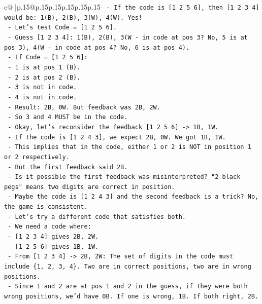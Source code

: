 \documentclass{article}
\begin{document}
{\begin{supertabular}{c@{$\;$}|p{.15\linewidth}@{}p{.15\linewidth}p{.15\linewidth}p{.15\linewidth}p{.15\linewidth}p{.15\linewidth}}
{{{\texttt{        {-} If the code is {[}1 2 5 6{]}, then {[}1 2 3 4{]} would be: 1(B), 2(B), 3(W), 4(W). Yes!} \\
\texttt{        {-} Let's test Code = {[}1 2 5 6{]}.} \\
\texttt{          {-} Guess {[}1 2 3 4{]}: 1(B), 2(B), 3(W {-} in code at pos 3? No, 5 is at pos 3), 4(W {-} in code at pos 4? No, 6 is at pos 4).} \\
\texttt{          {-} If Code = {[}1 2 5 6{]}:} \\
\texttt{            {-} 1 is at pos 1 (B).} \\
\texttt{            {-} 2 is at pos 2 (B).} \\
\texttt{            {-} 3 is not in code.} \\
\texttt{            {-} 4 is not in code.} \\
\texttt{            {-} Result: 2B, 0W. But feedback was 2B, 2W.} \\
\texttt{        {-} So 3 and 4 MUST be in the code.} \\
\texttt{      {-} Okay, let's reconsider the feedback {[}1 2 5 6{]} {-}> 1B, 1W.} \\
\texttt{        {-} If the code is {[}1 2 4 3{]}, we expect 2B, 0W. We got 1B, 1W.} \\
\texttt{        {-} This implies that in the code, either 1 or 2 is NOT in position 1 or 2 respectively.} \\
\texttt{        {-} But the first feedback said 2B.} \\
\texttt{        {-} Is it possible the first feedback was misinterpreted? "2 black pegs" means two digits are correct in position.} \\
\texttt{        {-} Maybe the code is {[}1 2 4 3{]} and the second feedback is a trick? No, the game is consistent.} \\
\texttt{        {-} Let's try a different code that satisfies both.} \\
\texttt{        {-} We need a code where:} \\
\texttt{          {-} {[}1 2 3 4{]} gives 2B, 2W.} \\
\texttt{          {-} {[}1 2 5 6{]} gives 1B, 1W.} \\
\texttt{        {-} From {[}1 2 3 4{]} {-}> 2B, 2W: The set of digits in the code must include \{1, 2, 3, 4\}. Two are in correct positions, two are in wrong positions.} \\
\texttt{          {-} Since 1 and 2 are at pos 1 and 2 in the guess, if they were both wrong positions, we'd have 0B. If one is wrong, 1B. If both right, 2B.} \\
}}}
\end{supertabular}}
\end{document}
